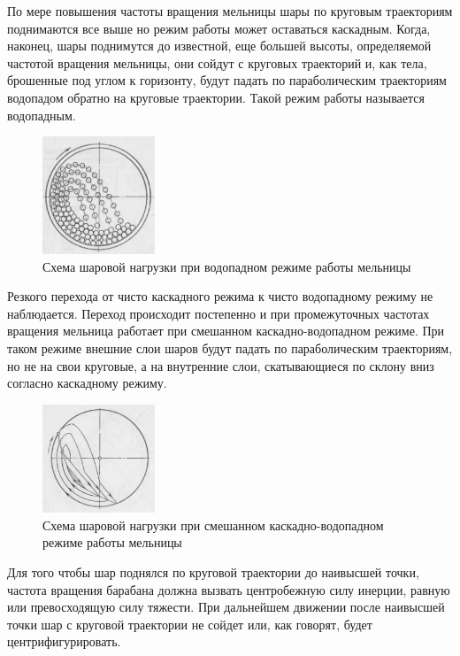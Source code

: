 \documentclass[a4paper]{article}
\begin{document}
По мере повышения частоты вращения мельницы шары по круговым траекториям поднимаются все выше но режим работы может оставаться каскадным.
Когда, наконец, шары поднимутся до известной, еще большей высоты, определяемой частотой вращения мельницы, они сойдут с круговых траекторий и, как тела, брошенные под углом к горизонту, будут падать по параболическим траекториям водопадом обратно на круговые траектории.
Такой режим работы называется водопадным.

\begin{figure}[H]
	\centering
	\includegraphics[width=0.3\textwidth]{vodopad_theory} 
	\caption{Схема шаровой нагрузки при водопадном режиме работы мельницы}
	\label{pic:vodopad_theory}
\end{figure} 

Резкого перехода от чисто каскадного режима к чисто водопадному режиму не наблюдается.
Переход происходит постепенно и при промежуточных частотах вращения мельница работает при смешанном каскадно-водопадном режиме.
При таком режиме внешние слои шаров будут падать по параболическим траекториям, но не на свои круговые, а на внутренние слои, скатывающиеся по склону вниз согласно каскадному режиму.

\begin{figure}[H]
	\centering
	\includegraphics[width=0.3\textwidth]{smeshan_theory} 
	\caption{Схема шаровой нагрузки при смешанном каскадно-водопадном режиме работы мельницы}
	\label{pic:smeshan_theory}
\end{figure} 

Для того чтобы шар поднялся по круговой траектории до наивысшей точки, частота вращения барабана должна вызвать центробежную силу инерции, равную или превосходящую силу тяжести.
При дальнейшем движении после наивысшей точки шар с круговой траектории не сойдет или, как говорят, будет центрифигурировать.
\end{document}
